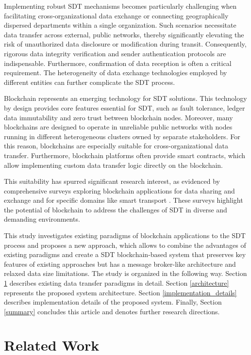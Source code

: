 \documentclass[10pt]{llncs}
\begin{document}
Implementing robust SDT mechanisms becomes particularly challenging when facilitating cross-organizational data exchange or connecting geographically dispersed departments within a single organization.
Such scenarios necessitate data transfer across external, public networks, thereby significantly elevating the risk of unauthorized data disclosure or modification during transit.
Consequently, rigorous data integrity verification and sender authentication protocols are indispensable.
Furthermore, confirmation of data reception is often a critical requirement.
The heterogeneity of data exchange technologies employed by different entities can further complicate the SDT process.

Blockchain represents an emerging technology for SDT solutions.
This technology by design provides core features essential for SDT, such as fault tolerance, ledger data immutability and zero trust between blockchain nodes.
Moreover, many blockchains are designed to operate in unreliable public networks with nodes running in different heterogeneous clusters owned by separate stakeholders.
For this reason, blockchains are especially suitable for cross-organizational data transfer.
Furthermore, blockchain platforms often provide smart contracts, which allow implementing custom data transfer logic directly on the blockchain.

This suitability has spurred significant research interest, as evidenced by comprehensive surveys exploring blockchain applications for data sharing and exchange \cite{Song2023} and for specific domains like smart transport \cite{Bagga2022}.
These surveys highlight the potential of blockchain to address the challenges of SDT in diverse and demanding environments.

This study investigates existing paradigms of blockchain applications to the SDT process and proposes a new approach, which allows to combine the advantages of existing paradigms and create 
a SDT blockchain-based system that preserves key features of existing approaches but has a message broker-like architecture and relaxed data size limitations.
The study is organized in the following way.
Section \ref{related_work} describes existing data transfer paradigms in detail.
Section \ref{architecture} represents the proposed system architecture.
Section \ref{implementation_details} describes implementation details of the proposed system.
Finally, Section \ref{summary} concludes this article and denotes further research directions.

\section{Related Work} \label{related_work}
\end{document}
